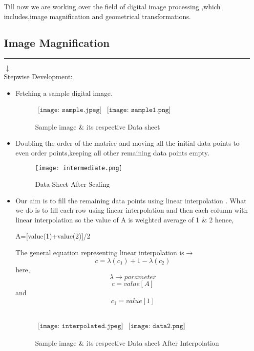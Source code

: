 \documentclass[a4paper, 12pt]{article}
\begin{document}
Till now we are working over the field of digital image processing ,which includes,image magnification and geometrical transformations.
\\
\subsection{Image Magnification}\hrule
$\downarrow$ \\
Stepwise Development:\\
\begin{itemize}
\item Fetching a sample digital image.\\
\begin{figure}[h]
\begin{center}$
\begin{array}{cc}
\texttt{[image: sample.jpeg]} &
\texttt{[image: sample1.png]}
\end{array}$
\end{center}
\caption{Sample image \& its respective Data sheet}
\end{figure}
\newpage
\item Doubling the order of the matrice and moving all the initial data points to even order points,keeping all other remaining data points empty.
\\
\begin{figure}[htbp]
\centering

  \texttt{[image: intermediate.png]}
  \caption{Data Sheet After Scaling}
  \label{fig:sub1}

\end{figure}


\item Our aim is to fill the remaining data points using linear interpolation . What we do is to fill each row using linear interpolation and then each column with linear interpolation so the value of A is weighted average of  1 \& 2 hence,\\
\begin{center}
A=[value(1)+value(2)]/2
\end{center} 
The general equation representing linear interpolation is$\rightarrow$
	\[c=\lambda(c_1)+1-\lambda(c_2)\] here,
\[\lambda\rightarrow parameter\] \[c=value[A]\] and \[c_1=value[1]\] \\
\begin{figure}[h]
\begin{center}$
\begin{array}{cc}
\texttt{[image: interpolated.jpeg]} &
\texttt{[image: data2.png]}
\end{array}$
\end{center}
\caption{Sample image \& its respective Data sheet After Interpolation}
\end{figure}


\end{itemize}
\end{document}
